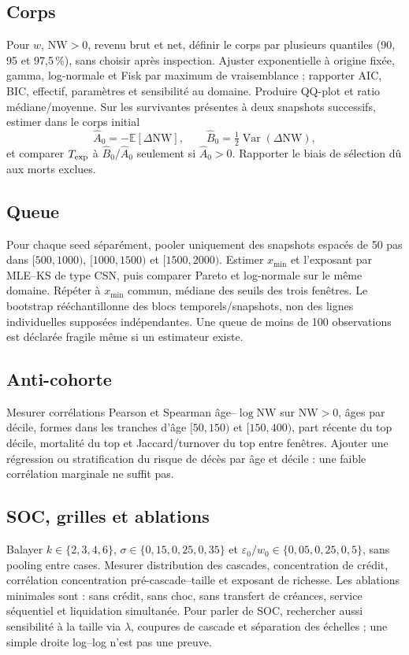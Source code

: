 \documentclass[11pt,a4paper]{article}
\newcommand{\NW}{\mathrm{NW}}
\begin{document}
\subsection{Corps}

Pour $w$, $\NW>0$, revenu brut et net, définir le corps par plusieurs quantiles
(90, 95 et 97,5\,\%), sans choisir après inspection. Ajuster exponentielle à
origine fixée, gamma, log-normale et Fisk par maximum de vraisemblance ; rapporter
AIC, BIC, effectif, paramètres et sensibilité au domaine. Produire QQ-plot et
ratio médiane/moyenne. Sur les survivantes présentes à deux snapshots successifs,
estimer dans le corps initial
\[
 \widehat A_0=-\mathbb E[\Delta\NW],\qquad
 \widehat B_0=\tfrac12\operatorname{Var}(\Delta\NW),
\]
et comparer $T_{\rm exp}$ à $\widehat B_0/\widehat A_0$ seulement si
$\widehat A_0>0$. Rapporter le biais de sélection dû aux morts exclues.

\subsection{Queue}

Pour chaque seed séparément, pooler uniquement des snapshots espacés de 50 pas
dans $[500,1000)$, $[1000,1500)$ et $[1500,2000)$. Estimer $x_{\min}$ et
l'exposant par MLE--KS de type CSN, puis comparer Pareto et log-normale sur le
même domaine. Répéter à $x_{\min}$ commun, médiane des seuils des trois fenêtres.
Le bootstrap rééchantillonne des blocs temporels/snapshots, non des lignes
individuelles supposées indépendantes. Une queue de moins de 100 observations est
déclarée fragile même si un estimateur existe.

\subsection{Anti-cohorte}

Mesurer corrélations Pearson et Spearman âge--$\log\NW$ sur $\NW>0$, âges par
décile, formes dans les tranches d'âge $[50,150)$ et $[150,400)$, part récente du
top décile, mortalité du top et Jaccard/turnover du top entre fenêtres. Ajouter
une régression ou stratification du risque de décès par âge et décile : une faible
corrélation marginale ne suffit pas.

\subsection{SOC, grilles et ablations}

Balayer $k\in\{2,3,4,6\}$, $\sigma\in\{0{,}15,0{,}25,0{,}35\}$ et
$\varepsilon_0/w_0\in\{0{,}05,0{,}25,0{,}5\}$, sans pooling entre cases. Mesurer
distribution des cascades, concentration de crédit, corrélation concentration
pré-cascade--taille et exposant de richesse. Les ablations minimales sont : sans
crédit, sans choc, sans transfert de créances, service séquentiel et liquidation
simultanée. Pour parler de SOC, rechercher aussi sensibilité à la taille via
$\lambda$, coupures de cascade et séparation des échelles ; une simple droite
log--log n'est pas une preuve.
\end{document}
